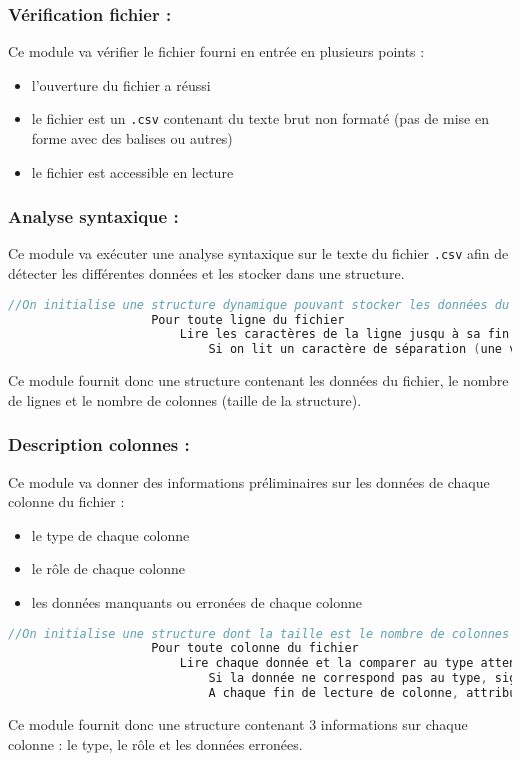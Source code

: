 			\subsubsection{Vérification fichier :}
				Ce module va vérifier le fichier fourni en entrée en plusieurs points :
				\begin{itemize}
					\item l'ouverture du fichier a réussi
					\item le fichier est un \lstinline!.csv! contenant du texte brut non formaté (pas de mise en forme avec des balises ou autres)
					\item le fichier est accessible en lecture
				\end{itemize}
			
			\subsubsection{Analyse syntaxique :}
				Ce module va exécuter une analyse syntaxique sur le texte du fichier \lstinline!.csv! afin de détecter les différentes données et les stocker dans une structure.
				\begin{lstlisting}[language=C]
					//On initialise une structure dynamique pouvant stocker les données du fichier (tableau 2D dynamique ou liste de listes)
					Pour toute ligne du fichier
						Lire les caractères de la ligne jusqu à sa fin
							Si on lit un caractère de séparation (une virgule, un point-virgule ou une tabulation) ou une fin de ligne, on stocke les caractères lus dans la case correspondante de la structure
				\end{lstlisting}
				Ce module fournit donc une structure contenant les données du fichier, le nombre de lignes et le nombre de colonnes (taille de la structure).
				
			\subsubsection{Description colonnes :}
				Ce module va donner des informations préliminaires sur les données de chaque colonne du fichier :
				\begin{itemize}
					\item le type de chaque colonne
					\item le rôle de chaque colonne
					\item les données manquants ou erronées de chaque colonne
				\end{itemize}
				\begin{lstlisting}[language=C]
					//On initialise une structure dont la taille est le nombre de colonnes qui contient 3 champs
					Pour toute colonne du fichier
						Lire chaque donnée et la comparer au type attendu
							Si la donnée ne correspond pas au type, signaler dans la structure une donnée erronée
							A chaque fin de lecture de colonne, attribuer un rôle à celle-ci
				\end{lstlisting}
				Ce module fournit donc une structure contenant 3 informations sur chaque colonne : le type, le rôle et les données erronées.

